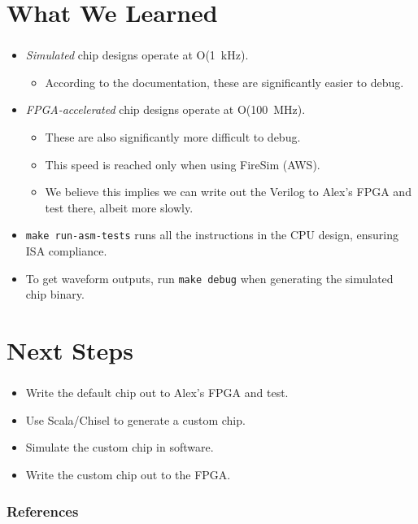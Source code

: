 \documentclass{../weeklyslides}
\begin{document}
\section{What We Learned}\label{sec:What_We_Learned}
\begin{frame}
  \frametitle{}
  \begin{itemize}
  \item \emph{Simulated} chip designs operate at O(\SI{1}{\kilo\hertz}).
    \begin{itemize}
    \item According to the documentation, these are significantly easier to debug.
    \end{itemize}
  \item \emph{FPGA-accelerated} chip designs operate at O(\SI{100}{\mega\hertz}).
    \begin{itemize}
    \item These are also significantly more difficult to debug.
    \item This speed is reached only when using FireSim (AWS).
    \item We believe this implies we can write out the Verilog to Alex's FPGA and test there, albeit more slowly.
    \end{itemize}
  \item \texttt{make run-asm-tests} runs all the instructions in the CPU design, ensuring ISA compliance.
  \item To get waveform outputs, run \texttt{make debug} when generating the simulated chip binary.
  \end{itemize}
\end{frame}

\section{Next Steps}\label{sec:Next_Steps}
\begin{frame}
  \frametitle{}
  \begin{itemize}
  \item Write the default chip out to Alex's FPGA and test.
  \item Use Scala/Chisel to generate a custom chip.
  \item Simulate the custom chip in software.
  \item Write the custom chip out to the FPGA.\@
  \end{itemize}
\end{frame}

\begin{frame}
  \frametitle{References}
  \printbibliography[heading=bibintoc]{}
\end{frame}
\end{document}
